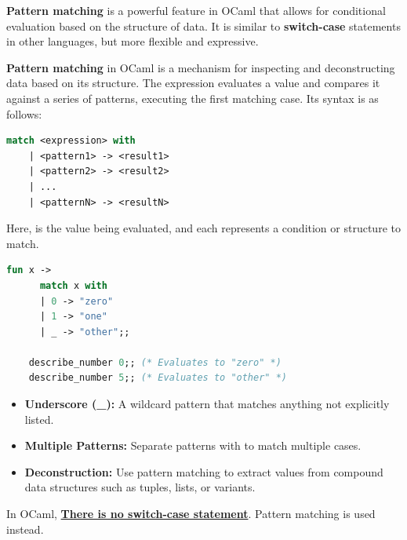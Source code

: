 \textbf{Pattern matching} is a powerful feature in OCaml that allows for conditional evaluation based on the structure of data. It is similar to \textbf{switch-case} statements in other languages, but more flexible and expressive.\\

\begin{Def}

    \textbf{Pattern matching} in OCaml is a mechanism for inspecting and deconstructing data based on its structure. 
    The  expression evaluates a value and compares it against a series of patterns, executing the first matching case. Its syntax is as follows:
    
    \begin{lstlisting}[language=OCaml, caption={Pattern Matching Syntax}, numbers=none]
    match <expression> with
    | <pattern1> -> <result1>
    | <pattern2> -> <result2>
    | ...
    | <patternN> -> <resultN>
    \end{lstlisting}
    
    \noindent
    Here,  is the value being evaluated, and each  represents a condition or structure to match.
    
    \begin{lstlisting}[language=OCaml, caption={Matching an Integer}, numbers=none]
    fun x ->
      match x with
      | 0 -> "zero"
      | 1 -> "one"
      | _ -> "other";;
    
    describe_number 0;; (* Evaluates to "zero" *)
    describe_number 5;; (* Evaluates to "other" *)
    \end{lstlisting}
    
    \begin{itemize}
        \item \textbf{Underscore (\_):} A wildcard pattern that matches anything not explicitly listed.
        \item \textbf{Multiple Patterns:} Separate patterns with \snippet{|} to match multiple cases.
        \item \textbf{Deconstruction:} Use pattern matching to extract values from compound data structures such as tuples, lists, or variants.
    \end{itemize}
\end{Def}

\begin{Def}

    In OCaml, \underline{\textbf{There is no switch-case statement}}. Pattern matching is used instead.
\end{Def}

